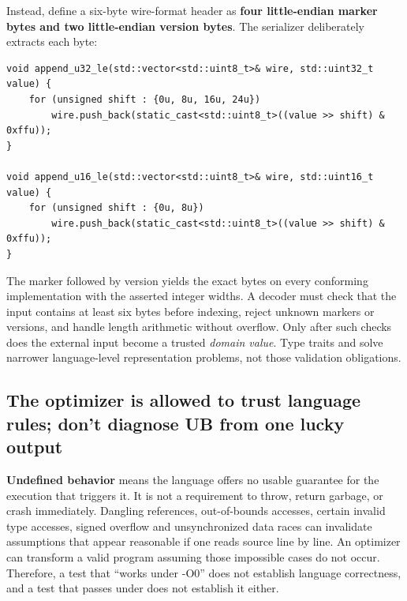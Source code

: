 Instead, define a six-byte wire-format header as \textbf{four little-endian marker bytes and two little-endian version bytes}. The serializer deliberately extracts each byte:

\begin{verbatim}
void append_u32_le(std::vector<std::uint8_t>& wire, std::uint32_t value) {
    for (unsigned shift : {0u, 8u, 16u, 24u})
        wire.push_back(static_cast<std::uint8_t>((value >> shift) & 0xffu));
}

void append_u16_le(std::vector<std::uint8_t>& wire, std::uint16_t value) {
    for (unsigned shift : {0u, 8u})
        wire.push_back(static_cast<std::uint8_t>((value >> shift) & 0xffu));
}
\end{verbatim}

The marker  followed by version  yields the exact bytes  on every conforming implementation with the asserted integer widths. A decoder must check that the input contains at least six bytes before indexing, reject unknown markers or versions, and handle length arithmetic without overflow. Only after such checks does the external input become a trusted \emph{domain value}. Type traits and  solve narrower language-level representation problems, not those validation obligations.

\subsection{The optimizer is allowed to trust language rules; don't diagnose UB from one lucky output}\label{01-foundations-i-ch004-the-optimizer-is-allowed-to-trust-language-rules-dont-diagnose-ub-from-one-lucky-output}

\hypertarget{01-foundations-i-ch004-the-optimizer-is-allowed-to-trust-language-rules-dont-diagnose-ub-from-one-lucky-output}{}

\textbf{Undefined behavior} means the language offers no usable guarantee for the execution that triggers it. It is not a requirement to throw, return garbage, or crash immediately. Dangling references, out-of-bounds accesses, certain invalid type accesses, signed overflow and unsynchronized data races can invalidate assumptions that appear reasonable if one reads source line by line. An optimizer can transform a valid program assuming those impossible cases do not occur. Therefore, a test that ``works under -O0'' does not establish language correctness, and a test that passes under  does not establish it either.

